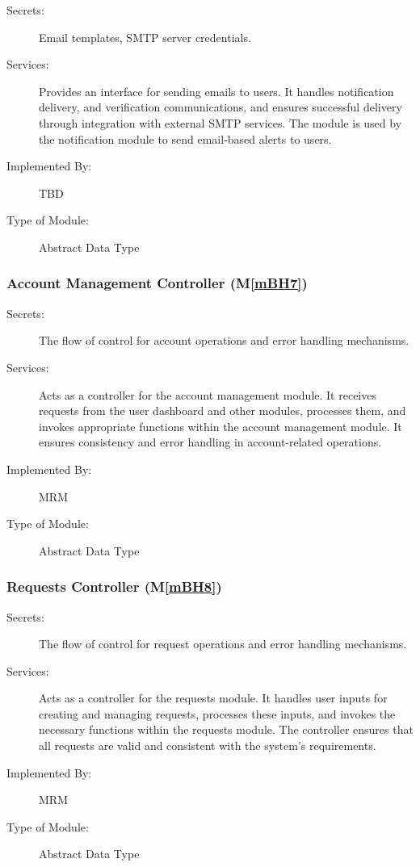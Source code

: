\documentclass[12pt, titlepage]{article}
\newcommand{\mref}[1]{M\ref{#1}}
\begin{document}
\begin{description}
\item[Secrets:] Email templates, SMTP server credentials.
\item[Services:] Provides an interface for sending emails to users. It handles notification delivery, and verification communications, and ensures successful delivery through integration with external SMTP services. The module is used by the notification module to send email-based alerts to users.
\item[Implemented By:] TBD
\item[Type of Module:] Abstract Data Type
\end{description}

\subsubsection{Account Management Controller (\mref{mBH7})}

\begin{description}
\item[Secrets:] The flow of control for account operations and error handling mechanisms.
\item[Services:] Acts as a controller for the account management module. It receives requests from the user dashboard and other modules, processes them, and invokes appropriate functions within the account management module. It ensures consistency and error handling in account-related operations.
\item[Implemented By:] MRM
\item[Type of Module:] Abstract Data Type
\end{description}

\subsubsection{Requests Controller (\mref{mBH8})}

\begin{description}
\item[Secrets:] The flow of control for request operations and error handling mechanisms.
\item[Services:] Acts as a controller for the requests module. It handles user inputs for creating and managing requests, processes these inputs, and invokes the necessary functions within the requests module. The controller ensures that all requests are valid and consistent with the system’s requirements.
\item[Implemented By:] MRM
\item[Type of Module:] Abstract Data Type
\end{description}
\end{document}
